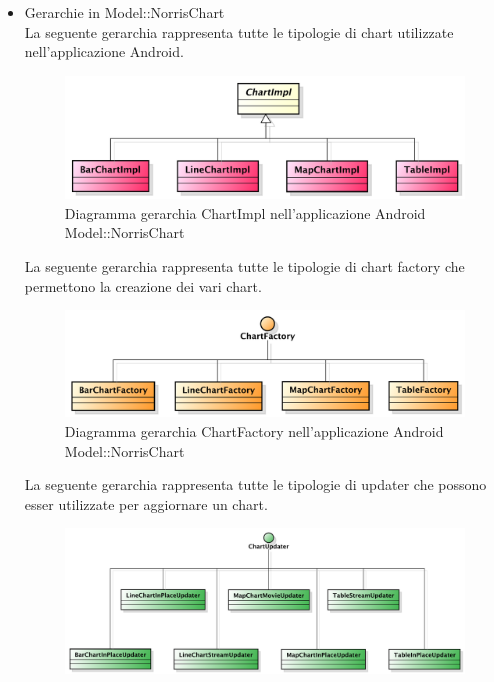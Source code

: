             \begin{itemize}
                \item Gerarchie in Model::NorrisChart \\
                    La seguente gerarchia rappresenta tutte le tipologie di chart utilizzate nell'applicazione Android.
                    \begin{figure}[H]
                        \centering
                        \includegraphics[width=1\textwidth]{DefinizioneDiProdotto/Pics/Gerarchie/ModelChartImpl.pdf}
                        \caption{Diagramma gerarchia ChartImpl nell'applicazione Android Model::NorrisChart }
                    \end{figure}
                    La seguente gerarchia rappresenta tutte le tipologie di chart factory che permettono la creazione dei vari chart.
                    \begin{figure}[H]
                        \centering
                        \includegraphics[width=1\textwidth]{DefinizioneDiProdotto/Pics/Gerarchie/ModelFactory.pdf}
                        \caption{Diagramma gerarchia ChartFactory nell'applicazione Android Model::NorrisChart}
                    \end{figure}
                    La seguente gerarchia rappresenta tutte le tipologie di updater che possono esser utilizzate per aggiornare un chart.
                    \begin{figure}[H]
                        \centering
                        \includegraphics[width=1\textwidth]{DefinizioneDiProdotto/Pics/Gerarchie/ModelUpdater.pdf}

\end{figure}
\end{itemize}
